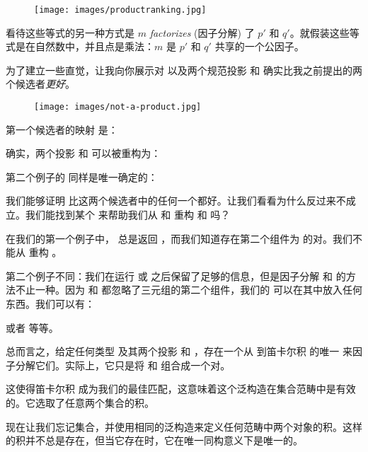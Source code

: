 
\begin{figure}[H]
  \centering
  \texttt{[image: images/productranking.jpg]}
\end{figure}

\noindent
看待这些等式的另一种方式是 $m$ \emph{factorizes} (因子分解) 了 $p'$ 和 $q'$。就假装这些等式是在自然数中，并且点是乘法：$m$ 是 $p'$ 和 $q'$ 共享的一个公因子。

为了建立一些直觉，让我向你展示对  以及两个规范投影  和  确实比我之前提出的两个候选者\emph{更好}。

\begin{figure}[H]
  \centering
  \texttt{[image: images/not-a-product.jpg]}
\end{figure}

\noindent
第一个候选者的映射  是：

确实，两个投影  和  可以被重构为：

第二个例子的  同样是唯一确定的：

我们能够证明  比这两个候选者中的任何一个都好。让我们看看为什么反过来不成立。我们能找到某个  来帮助我们从  和  重构  和  吗？

在我们的第一个例子中， 总是返回 ，而我们知道存在第二个组件为  的对。我们不能从  重构 。

第二个例子不同：我们在运行  或  之后保留了足够的信息，但是因子分解  和  的方法不止一种。因为  和  都忽略了三元组的第二个组件，我们的  可以在其中放入任何东西。我们可以有：


或者
等等。

总而言之，给定任何类型  及其两个投影  和 ，存在一个从  到笛卡尔积  的唯一  来因子分解它们。实际上，它只是将  和  组合成一个对。

这使得笛卡尔积  成为我们的最佳匹配，这意味着这个泛构造在集合范畴中是有效的。它选取了任意两个集合的积。

现在让我们忘记集合，并使用相同的泛构造来定义任何范畴中两个对象的积。这样的积并不总是存在，但当它存在时，它在唯一同构意义下是唯一的。

